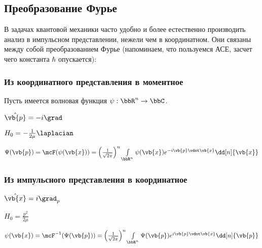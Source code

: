 

\subsection{Преобразование Фурье}
В задачах квантовой механики часто удобно и более естественно производить анализ в импульсном представлении, нежели чем в координатном. Они связаны между собой преобразованием Фурье (напоминаем, что пользуемся АСЕ, засчет чего константа $\hbar$ опускается):

\subsubsection{Из координатного представления в моментное}
Пусть имеется волновая функция $\psi: \bbR^n \to \bbC$. 

$\hat{\vb{p}} = -i \grad$

$H_0 = - \frac{1}{2 \mu} \laplacian$

$\Psi(\vb{p}) = \mcF(\psi(\vb{x})) = \left(\frac{1}{\sqrt{2 \pi}}\right)^n \int\limits_{\bbR^n} \psi(\vb{x}) e^{-i \vb{p} \vdot \vb{x}} \dd[n]{\vb{x}}$

\subsubsection{Из импульсного представления в координатное}

$\hat{\vb{x}} = i \grad_p$

$H_0 = \frac{p^2}{2 \mu}$

$\psi(\vb{x}) = \mcF^{-1}(\Psi(\vb{p})) = \left(\frac{1}{\sqrt{2 \pi}}\right)^n \int\limits_{\bbR^n} \Psi(\vb{p}) e^{i \vb{p} \vdot \vb{x}} \dd[n]{\vb{p}}$